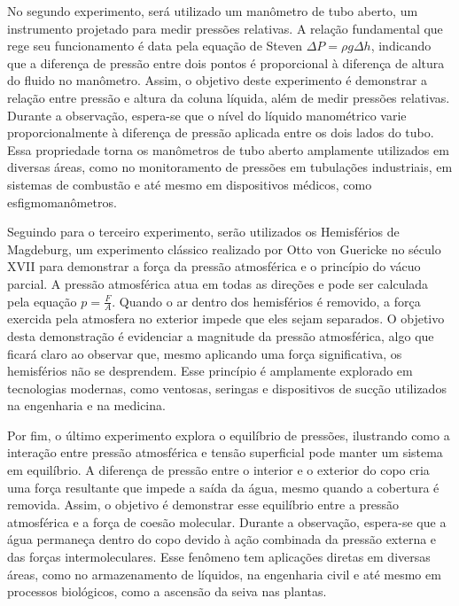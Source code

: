 No segundo experimento,  será utilizado um manômetro de tubo aberto, um instrumento projetado para medir pressões relativas. A relação fundamental que rege seu funcionamento é data pela equação de Steven \(\Delta P = \rho g \Delta h\), indicando que a diferença de pressão entre dois pontos é proporcional à diferença de altura do fluido no manômetro. Assim, o objetivo deste experimento é demonstrar a relação entre pressão e altura da coluna líquida, além de medir pressões relativas. Durante a observação, espera-se que o nível do líquido manométrico varie proporcionalmente à diferença de pressão aplicada entre os dois lados do tubo. Essa propriedade torna os manômetros de tubo aberto amplamente utilizados em diversas áreas, como no monitoramento de pressões em tubulações industriais, em sistemas de combustão e até mesmo em dispositivos médicos, como esfigmomanômetros.


Seguindo para o terceiro experimento, serão utilizados os Hemisférios de Magdeburg, um experimento clássico realizado por Otto von Guericke no século XVII para demonstrar a força da pressão atmosférica e o princípio do vácuo parcial. A pressão atmosférica atua em todas as direções e pode ser calculada pela equação \(p =\frac{F}{A}\). Quando o ar dentro dos hemisférios é removido, a força exercida pela atmosfera no exterior impede que eles sejam separados. O objetivo desta demonstração é evidenciar a magnitude da pressão atmosférica, algo que ficará claro ao observar que, mesmo aplicando uma força significativa, os hemisférios não se desprendem. Esse princípio é amplamente explorado em tecnologias modernas, como ventosas, seringas e dispositivos de sucção utilizados na engenharia e na medicina.


Por fim, o último experimento explora o equilíbrio de pressões, ilustrando como a interação entre pressão atmosférica e tensão superficial pode manter um sistema em equilíbrio. A diferença de pressão entre o interior e o exterior do copo cria uma força resultante que impede a saída da água, mesmo quando a cobertura é removida. Assim, o objetivo é demonstrar esse equilíbrio entre a pressão atmosférica e a força de coesão molecular. Durante a observação, espera-se que a água permaneça dentro do copo devido à ação combinada da pressão externa e das forças intermoleculares. Esse fenômeno tem aplicações diretas em diversas áreas, como no armazenamento de líquidos, na engenharia civil e até mesmo em processos biológicos, como a ascensão da seiva nas plantas.
